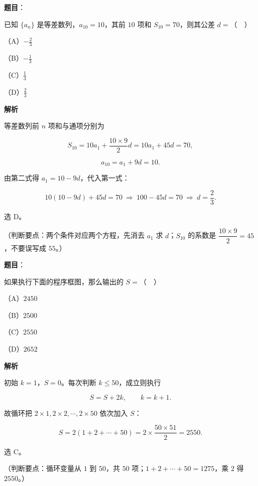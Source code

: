 \begin{answer}

\textbf{题目}：

已知 $\{a_n\}$ 是等差数列，$a_{10}=10$，其前 $10$ 项和 $S_{10}=70$，则其公差 $d=$（　）

（A）$-\frac23$

（B）$-\frac13$

（C）$\frac13$

（D）$\frac23$

\textbf{解析}

等差数列前 $n$ 项和与通项分别为

\nopagebreak[4]
\[S_{10}=10a_1+\frac{10\times9}{2}d=10a_1+45d=70,\]

\nopagebreak[4]
\[a_{10}=a_1+9d=10.\]

由第二式得 $a_1=10-9d$，代入第一式：

\nopagebreak[4]
\[10(10-9d)+45d=70\ \Rightarrow\ 100-45d=70\ \Rightarrow\ d=\frac23.\]

选 D。

（判断要点：两个条件对应两个方程，先消去 $a_1$ 求 $d$；$S_{10}$ 的系数是 $\dfrac{10\times9}{2}=45$，不要误写成 $55$。）


\end{answer}
\begin{answer}

\textbf{题目}：

如果执行下面的程序框图，那么输出的 $S=$（　）
\nopagebreak[4]
\begin{center}\end{center}
\nopagebreak[4]
（A）$2450$

（B）$2500$

（C）$2550$

（D）$2652$

\textbf{解析}

初始 $k=1$，$S=0$。每次判断 $k\leqslant50$，成立则执行

\nopagebreak[4]
\[S=S+2k,\qquad k=k+1.\]

故循环把 $2\times1,2\times2,\cdots,2\times50$ 依次加入 $S$：

\nopagebreak[4]
\[S=2(1+2+\cdots+50)=2\times\frac{50\times51}{2}=2550.\]

选 C。

（判断要点：循环变量从 $1$ 到 $50$，共 $50$ 项；$1+2+\cdots+50=1275$，乘 $2$ 得 $2550$。）


\end{answer}
